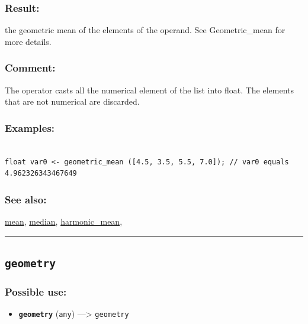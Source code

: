 \documentclass[]{book}
\providecommand{\tightlist}{%
  \setlength{\itemsep}{0pt}\setlength{\parskip}{0pt}}
\theoremstyle{definition}
\theoremstyle{definition}
\theoremstyle{definition}
\theoremstyle{remark}
\begin{document}
\subsubsection{Result:}\label{result-184}

the geometric mean of the elements of the operand. See Geometric\_mean
for more details.

\subsubsection{Comment:}\label{comment-43}

The operator casts all the numerical element of the list into float. The
elements that are not numerical are discarded.

\subsubsection{Examples:}\label{examples-139}

\begin{verbatim}
 
float var0 <- geometric_mean ([4.5, 3.5, 5.5, 7.0]); // var0 equals 4.962326343467649
\end{verbatim}

\subsubsection{See also:}\label{see-also-106}

\href{operators-i-to-m.html\#mean}{mean},
\href{operators-i-to-m.html\#median}{median},
\href{operators-d-to-h.html\#harmonic_mean}{harmonic\_mean},

\begin{center}\rule{0.5\linewidth}{\linethickness}\end{center}

\subsection{\texorpdfstring{\texttt{geometry}}{geometry}}\label{geometry}

\subsubsection{Possible use:}\label{possible-use-191}

\begin{itemize}
\tightlist
\item
  \textbf{\texttt{geometry}} (\texttt{any}) ---\textgreater{}
  \texttt{geometry}
\end{itemize}
\end{document}
